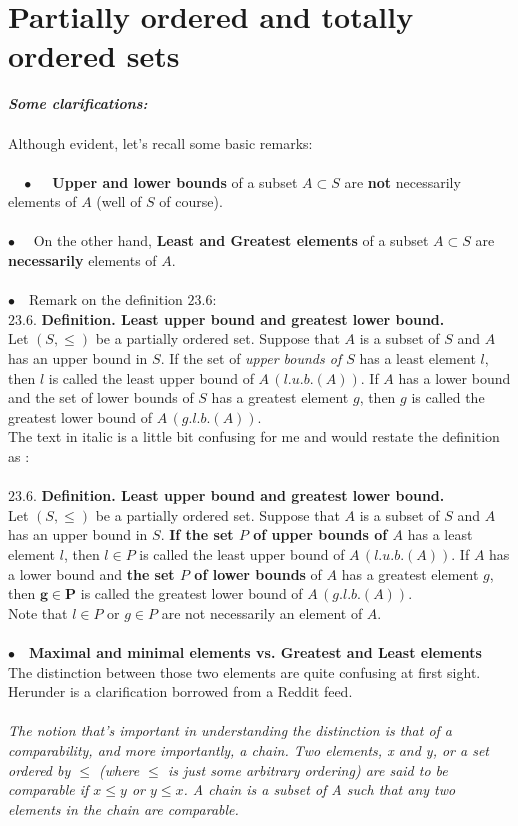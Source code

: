 \section{Partially ordered and totally ordered sets}
\textit{\textbf{Some clarifications:}}\\\\
Although evident, let's recall some basic remarks:\\\\
$\quad\bullet\quad$ \textbf{Upper and lower bounds} of a subset $A\subset S$ are \textbf{not} necessarily elements of $A$ (well of $S$ of course).\\\\
$\bullet\quad$ On the other hand, \textbf{Least  and Greatest elements}  of a subset $A\subset S$ are \textbf{necessarily} elements of $A$.\\\\
$\bullet\quad$Remark on the definition $\mathbf{23.6}$:\\
$\mathbf{23.6.}$ \textbf{Definition. Least upper bound and greatest lower bound. }\\
Let $(S,\leq)$ be a partially ordered set. Suppose that $A$ is a subset of $S$ and $A$ has an upper bound in $S$. If the set of \textit{upper bounds of $S$ }has a least element $l$, then $l$ is called the least upper bound of $A\, (l.u.b.(A))$. If $A$ has a lower bound and the set of lower bounds of $S$ has a greatest element $g$, then $g$ is called the greatest lower bound of $A\, (g.l.b. (A))$. \\
The text in italic is a little bit confusing for me and would restate the definition as :\\\\
$\mathbf{23.6.}$ \textbf{Definition. Least upper bound and greatest lower bound. }\\
Let $(S,\leq)$ be a partially ordered set. Suppose that $A$ is a subset of $S$ and $A$ has an upper bound in $S$. \textbf{If the set $P$ of upper bounds of $A$} has a least element $l$, then \textbf{$l\in P$} is called the least upper bound of $A\, (l.u.b.(A))$. If $A$ has a lower bound and \textbf{the set $P$ of lower bounds} of $A$ has a greatest element $g$, then $\mathbf{g\in P}$ is called the greatest lower bound of $A\, (g.l.b. (A))$. \\
Note that $l\in P$ or $g\in P$ are not necessarily an element of $A$.\\\\
$\bullet\quad$\textbf{Maximal and minimal elements vs. Greatest and Least elements} \\
The distinction between those two elements are quite confusing at first sight. Herunder is a clarification borrowed from a Reddit feed.\\\\
\textit{The notion that's important in understanding the distinction is that of a comparability, and more importantly, a chain. Two elements, x and y, or a set ordered by $\leq$ (where $\leq$ is just some arbitrary ordering) are said to be comparable if $x \leq y$ or $y \leq x$. A chain is a subset of A such that any two elements in the chain are comparable.}\\

